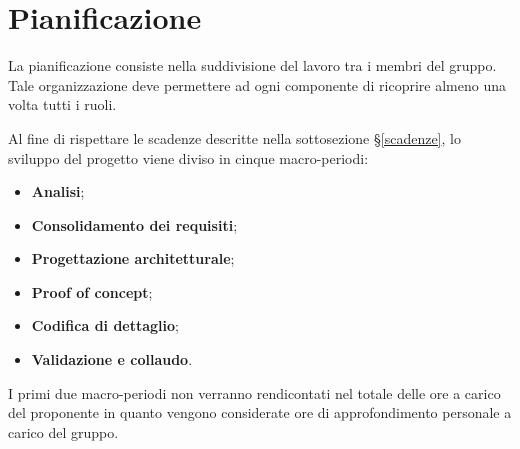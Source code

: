 \documentclass[../piano-di-progetto.tex]{subfiles}
\begin{document}
\section{Pianificazione}
La pianificazione consiste nella suddivisione del lavoro tra i membri del gruppo. Tale organizzazione deve permettere ad ogni componente di ricoprire almeno una volta tutti i ruoli.

Al fine di rispettare le scadenze descritte nella sottosezione \S\ref{scadenze}, lo sviluppo del progetto viene diviso in cinque macro-periodi:
\begin{itemize}
    \item \textbf{Analisi};
    \item \textbf{Consolidamento dei requisiti};
    \item \textbf{Progettazione architetturale};
    \item \textbf{Proof of concept};
    \item \textbf{Codifica di dettaglio};
    \item \textbf{Validazione e collaudo}.
\end{itemize}
I primi due macro-periodi non verranno rendicontati nel totale delle ore a carico del proponente in quanto vengono considerate ore di approfondimento personale a carico del gruppo.




\end{document}
